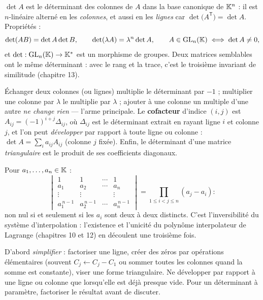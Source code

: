 \begin{theoreme}
$\det A$ est le déterminant des colonnes de $A$ dans la base canonique de
$\mathbb{K}^{n}$ : il est $n$-linéaire alterné en les \emph{colonnes}, et aussi en
les \emph{lignes} car $\det\bigl(A^{\mathsf T}\bigr)=\det A$. Propriétés :
\[
\det(AB)=\det A\det B,\qquad
\det(\lambda A)=\lambda^{n}\det A,\qquad
A\in\operatorname{GL}_n(\mathbb{K})\iff\det A\neq0 ,
\]
et $\det:\operatorname{GL}_n(\mathbb{K})\to\mathbb{K}^{*}$ est un morphisme de groupes.
Deux matrices semblables ont le même déterminant : avec le rang et la
trace, c'est le troisième invariant de similitude (chapitre 13).
\end{theoreme}


\begin{propriete}
Échanger deux colonnes (ou lignes) multiplie le déterminant par $-1$ ;
multiplier une colonne par $\lambda$ le multiplie par $\lambda$ ; ajouter à
une colonne un multiple d'une autre \emph{ne change rien} — l'arme
principale. Le \textbf{cofacteur} d'indice $(i,j)$ est
$A_{ij}=(-1)^{i+j}\Delta_{ij}$, où $\Delta_{ij}$ est le déterminant extrait
en rayant ligne $i$ et colonne $j$, et l'on peut \emph{développer} par
rapport à toute ligne ou colonne :
$\det A=\sum_{i}a_{ij}A_{ij}$ (colonne $j$ fixée). Enfin, le déterminant
d'une matrice \emph{triangulaire} est le produit de ses coefficients
diagonaux.
\end{propriete}

\begin{theoreme}
Pour $a_1,\dots,a_n\in\mathbb{K}$ :
\[
\begin{vmatrix}
1&1&\cdots&1\\
a_1&a_2&\cdots&a_n\\
\vdots&\vdots&&\vdots\\
a_1^{\,n-1}&a_2^{\,n-1}&\cdots&a_n^{\,n-1}
\end{vmatrix}
=\prod_{1\leqslant i<j\leqslant n}(a_j-a_i) :
\]
non nul si et seulement si les $a_i$ sont deux à deux distincts. C'est
l'inversibilité du système d'interpolation : l'existence et l'unicité du
polynôme interpolateur de Lagrange (chapitres 10 et 12) en découlent une
troisième fois.
\end{theoreme}

\begin{savoirfaire}
D'abord \emph{simplifier} : factoriser une ligne, créer des zéros par
opérations élémentaires (souvent $C_j\leftarrow C_j-C_1$ ou sommer toutes
les colonnes quand la somme est constante), viser une forme triangulaire.
Ne développer par rapport à une ligne ou colonne que lorsqu'elle est déjà
presque vide. Pour un déterminant à paramètre, factoriser le résultat
avant de discuter.
\end{savoirfaire}

